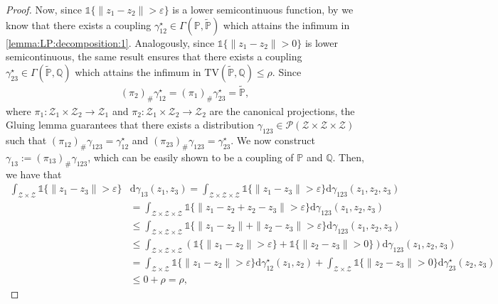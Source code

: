 \documentclass[11pt,a4paper]{article}
\begin{document}
\begin{proof}
Now, since $\mathds{1}\{\|z_1 - z_2\| > \varepsilon\}$ is a lower semicontinuous function, by \cite[Theorem 4.1]{villani2009optimal} we know that there exists a coupling $\gamma_{12}^\star\in\Gamma(\mathbb P, \widetilde{\mathbb P})$ which attains the infimum in \eqref{lemma:LP:decomposition:1}. Analogously, since $\mathds{1}\{\|z_1 - z_2\| > 0\}$ is lower semicontinuous, the same result ensures that there exists a coupling $\gamma_{23}^\star\in\Gamma(\widetilde{\mathbb P},\mathbb Q)$ which attains the infimum in $\text{TV}(\widetilde{\mathbb P}, \mathbb Q)\leq \rho$. Since 
\begin{align*}
    (\pi_2)_\# \gamma_{12}^\star = (\pi_1)_\# \gamma_{23}^\star = \widetilde{\mathbb P},
\end{align*}
where $\pi_1: \mathcal Z_1 \times \mathcal Z_2 \to \mathcal Z_1$ and $\pi_2: \mathcal Z_1 \times \mathcal Z_2 \to \mathcal Z_2$ are the canonical projections, the Gluing lemma \cite[pp.\ 11--12]{villani2009optimal} guarantees that there exists a distribution $\gamma_{123} \in \mathcal P(\mathcal Z \times \mathcal Z \times \mathcal Z)$ such that $(\pi_{12})_\# \gamma_{123} = \gamma_{12}^\star$ and $(\pi_{23})_\# \gamma_{123} = \gamma_{23}^\star$. We now construct $\gamma_{13}:= (\pi_{13})_\# \gamma_{123}$, which can be easily shown to be a coupling of $\mathbb P$ and $\mathbb Q$. Then, we have that
\begin{align*}
    \int_{\mathcal Z \times \mathcal Z} \mathds{1}\{\|z_1 - z_3\| > \varepsilon\} &\mathrm{d} \gamma_{13}(z_1,z_3) = \int_{\mathcal Z \times \mathcal Z \times \mathcal Z} \mathds{1}\{\|z_1 - z_3\| > \varepsilon\} \mathrm{d} \gamma_{123}(z_1,z_2,z_3)
    \\& = \int_{\mathcal Z \times \mathcal Z \times \mathcal Z} \mathds{1}\{\|z_1 - z_2 + z_2 - z_3\| > \varepsilon\} \mathrm{d} \gamma_{123}(z_1,z_2,z_3)
    \\& \leq \int_{\mathcal Z \times \mathcal Z \times \mathcal Z} \mathds{1}\{\|z_1 - z_2\| + \|z_2 - z_3\| > \varepsilon\} \mathrm{d} \gamma_{123}(z_1,z_2,z_3)
    \\& \leq \int_{\mathcal Z \times \mathcal Z \times \mathcal Z} \left(\mathds{1}\{\|z_1 - z_2\|>\varepsilon\} + \mathds{1}\{\|z_2 - z_3\| > 0\}\right) \mathrm{d} \gamma_{123}(z_1,z_2,z_3)
    \\& = \int_{\mathcal Z \times \mathcal Z} \mathds{1}\{\|z_1 - z_2\|>\varepsilon\} \mathrm{d} \gamma_{12}^\star(z_1,z_2) + \int_{\mathcal Z \times \mathcal Z} \mathds{1}\{\|z_2 - z_3\|>0\} \mathrm{d} \gamma_{23}^\star(z_2,z_3)
    \\& \leq 0 + \rho = \rho,

\end{align*}
\end{proof}
\end{document}
